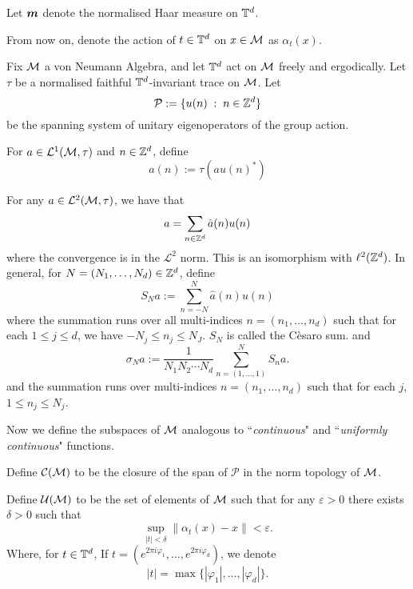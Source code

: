 Let $\boldsymbol{m}$ denote the normalised Haar measure on $\mathbb{T}^d$.

From now on, denote the action of $t \in \mathbb{T}^d$ on $x \in \mathcal{M}$ as $\alpha_t(x)$.

Fix $\mathcal{M}$ a von Neumann Algebra, and let $\mathbb{T}^d$ act on $\mathcal{M}$ freely
and ergodically. Let $\tau$ be a normalised faithful $\mathbb{T}^d$-invariant trace
on $\mathcal{M}$. Let
\begin{equation}
    \mathcal{P} := \{ u(n) \;:\; n \in \mathbb{Z}^d\}
\end{equation}
be the spanning system of unitary eigenoperators of the group action. 

For $a \in \mathcal{L}^1(\mathcal{M},\tau)$ and $n \in \mathbb{Z}^d$, define
\begin{equation}
    \hat{a}(n) := \tau(au(n)^*)
\end{equation}

For any $a \in \mathcal{L}^2(\mathcal{M},\tau)$, we have that
\begin{equation}
    a = \sum_{n \in \mathbb{Z}^d} \hat{a}(n)u(n)
\end{equation}
where the convergence is in the $\mathcal{L}^2$ norm. This is
an isomorphism with $\ell^2(\mathbb{Z}^d)$.
In general, for $N = (N_1,\ldots,N_d) \in \mathbb{Z}^d$, define
\begin{equation}
    S_N a := \sum_{n = -N}^N \hat{a}(n)u(n)
\end{equation}
where the summation runs over all multi-indices $n = (n_1,\ldots,n_d)$
such that for each $1\leq j \leq d$, we have $-N_j \leq n_j \leq N_J$.
$S_N$ is called the C\`esaro sum.
and
\begin{equation}
    \sigma_N a := \frac{1}{N_1N_2\cdots N_d}\sum_{n = (1,\ldots,1)}^N S_n a.
\end{equation}
and the summation runs over multi-indices $n = (n_1,\ldots,n_d)$
such that for each $j$, $1 \leq n_j \leq N_j$.

Now we define the subspaces of $\mathcal{M}$
analogous to ``\emph{continuous}" and ``\emph{uniformly continuous}"
functions. 
\begin{definition}
    Define $\mathcal{C}(\mathcal{M})$ to be the closure of the span of $\mathcal{P}$
    in the norm topology of $\mathcal{M}$.
    
    Define $\mathcal{U}(\mathcal{M})$ to be the set of elements of $\mathcal{M}$
    such that for any $\varepsilon > 0$ there exists $\delta > 0$ such that
    \begin{equation}
        \sup_{|t| < \delta} \|\alpha_t(x)-x\| < \varepsilon.    
    \end{equation}
    Where, for $t \in \mathbb{T}^d$, If $t = (e^{2\pi i\varphi_1},\ldots,e^{2\pi i\varphi_d})$, we 
    denote
    \begin{equation}
        |t| = \max\{|\varphi_1|,\ldots,|\varphi_d|\}.
    \end{equation}
\end{definition}


